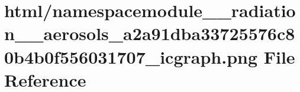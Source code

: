 \hypertarget{namespacemodule____radiation____aerosols__a2a91dba33725576c80b4b0f556031707__icgraph_8png}{}\section{html/namespacemodule\+\_\+\+\_\+radiation\+\_\+\+\_\+aerosols\+\_\+a2a91dba33725576c80b4b0f556031707\+\_\+icgraph.png File Reference}
\label{namespacemodule____radiation____aerosols__a2a91dba33725576c80b4b0f556031707__icgraph_8png}
